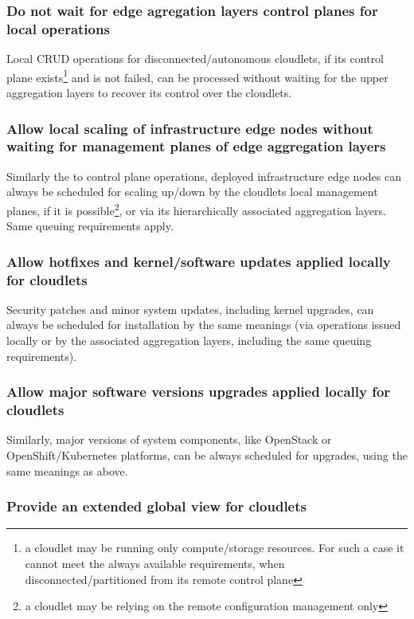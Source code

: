 \documentclass[conference]{IEEEtran}
\begin{document}
\subsubsection{Do not wait for edge agregation layers control planes for local
operations}

Local CRUD operations for disconnected/autonomous cloudlets,
if its control plane exists\footnote{a cloudlet may be running only
compute/storage resources. For such a case it cannot meet the always available
requirements, when disconnected/partitioned from its remote control plane} and
is not failed, can be processed without waiting for the upper aggregation
layers to recover its control over the cloudlets.

\subsubsection{Allow local scaling of infrastructure edge nodes without waiting
for management planes of edge aggregation layers}

Similarly the to control plane operations, deployed infrastructure edge nodes
can always be scheduled for scaling up/down by the cloudlets local management
planes, if it is possible\footnote{a cloudlet may be relying on the remote
configuration management only}, or via its hierarchically associated
aggregation layers. Same queuing requirements apply.

\subsubsection{Allow hotfixes and kernel/software updates applied locally for
cloudlets}

Security patches and minor system updates, including kernel upgrades, can
always be scheduled for installation by the same meanings (via operations
issued locally or by the associated aggregation layers, including the same
queuing requirements).

\subsubsection{Allow major software versions upgrades applied locally for
cloudlets}

Similarly, major versions of system components, like OpenStack or
OpenShift/Kubernetes platforms, can be always scheduled for upgrades, using the
same meanings as above.

\subsubsection{Provide an extended global view for cloudlets}
\end{document}
